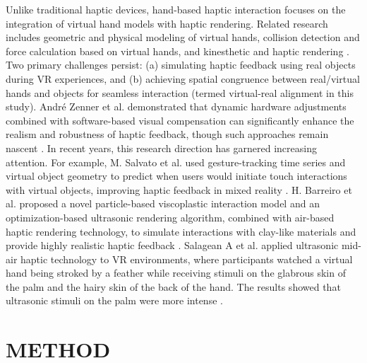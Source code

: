 \documentclass[runningheads]{llncs}
\begin{document}
Unlike traditional haptic devices, hand-based haptic interaction focuses on the integration of virtual hand models with haptic rendering. Related research includes geometric and physical modeling of virtual hands, collision detection and force calculation based on virtual hands, and kinesthetic and haptic rendering \cite{tong2023survey}. Two primary challenges persist: (a) simulating haptic feedback using real objects during VR experiences, and (b) achieving spatial congruence between real/virtual hands and objects for seamless interaction (termed virtual-real alignment in this study). André Zenner et al. demonstrated that dynamic hardware adjustments combined with software-based visual compensation can significantly enhance the realism and robustness of haptic feedback, though such approaches remain nascent \cite{zenner2021combining}. In recent years, this research direction has garnered increasing attention. For example, M. Salvato et al. used gesture-tracking time series and virtual object geometry to predict when users would initiate touch interactions with virtual objects, improving haptic feedback in mixed reality \cite{salvato2022predicting}. H. Barreiro et al. proposed a novel particle-based viscoplastic interaction model and an optimization-based ultrasonic rendering algorithm, combined with air-based haptic rendering technology, to simulate interactions with clay-like materials and provide highly realistic haptic feedback \cite{barreiro2021natural}. Salagean A et al. applied ultrasonic mid-air haptic technology to VR environments, where participants watched a virtual hand being stroked by a feather while receiving stimuli on the glabrous skin of the palm and the hairy skin of the back of the hand. The results showed that ultrasonic stimuli on the palm were more intense \cite{salagean2022virtual}.


\section{METHOD}
\end{document}
